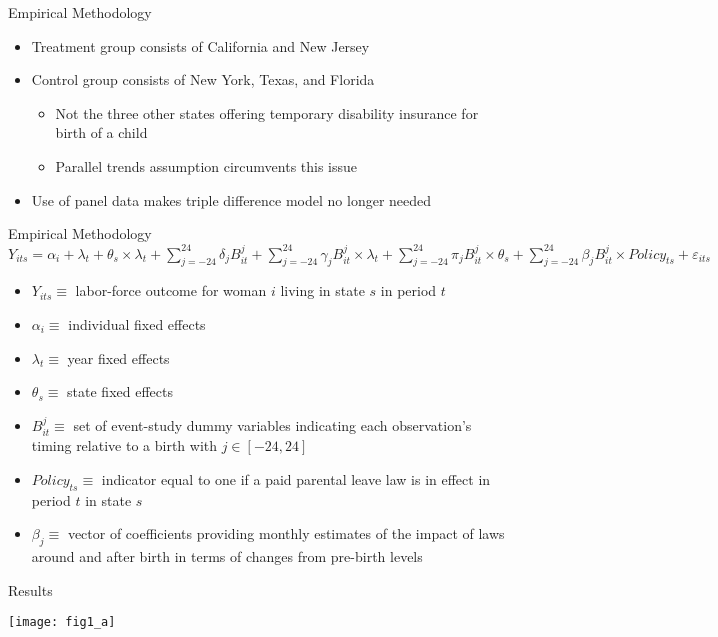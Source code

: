 \documentclass{beamer}
\begin{document}
\begin{frame}{Empirical Methodology}
	\begin{itemize}
	\item
	 Treatment group consists of California and New Jersey
	\item
	 Control group consists of New York, Texas, and Florida
	\begin{itemize}
		\item
		 Not the three other states offering temporary disability insurance for birth of a child
		 \item
		  Parallel trends assumption circumvents this issue
	\end{itemize}
	\item
	Use of panel data makes triple difference model no longer needed
	\end{itemize}
\end{frame}

\begin{frame}{Empirical Methodology}
	 $Y_{its} = \alpha_i + \lambda_t +\theta_s\times\lambda_t + \sum_{j=-24}^{24} {\delta_j B_{it}^j} + \sum_{j=-24}^{24} {\gamma_j B_{it}^j} \times\lambda_t + \sum_{j=-24}^{24} {\pi_j B_{it}^j} \times\theta_s + \sum_{j=-24}^{24}{\beta_j B_{it}^j} \times{Policy}_{ts} +\varepsilon_{its}$
\bigskip	
	\begin{itemize}
	\item
	 $Y_{its} \equiv$ labor-force outcome for woman $i$ living in state $s$ in period $t$
	\item
	 $\alpha_i \equiv$ individual fixed effects
	\item 
	 $\lambda_t \equiv$ year fixed effects
	\item
	 $\theta_s \equiv$ state fixed effects
	\item
	 $B^j_{it} \equiv$ set of event-study dummy variables indicating each observation's timing relative to a birth with $j \in [-24,24]$
	\item
	 ${Policy}_{ts} \equiv$ indicator equal to one if a paid parental leave law is in effect in period $t$ in state $s$
	\item
	 $\beta_j \equiv$ vector of coefficients providing monthly estimates of the impact of laws around and after birth in terms of changes from pre-birth levels
	\end{itemize}
\end{frame}

\begin{frame}{Results}
	\begin{center}
	\texttt{[image: fig1\_a]}
	\end{center}
\end{frame}
\end{document}
